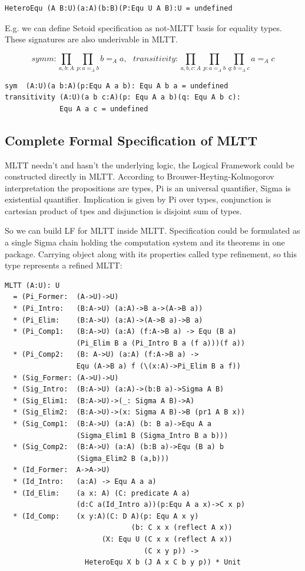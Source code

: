 \documentclass{svproc}
\begin{document}
\begin{lstlisting}[mathescape=true]
HeteroEqu (A B:U)(a:A)(b:B)(P:Equ U A B):U = undefined
\end{lstlisting}

E.g. we can define Setoid specification \cite{Bishop67} as not-MLTT basis
for equality types. These signatures are also underivable in MLTT.

$$symm : \prod_{a,b:A} \prod_{p:a =_A b} b =_A a,\ \ \ 
  transitivity : \prod_{a,b,c: A} \prod_{p: a =_A b} \prod_{q: b =_A c} a =_A c$$

\begin{lstlisting}[mathescape=true]
sym  (A:U)(a b:A)(p:Equ A a b): Equ A b a = undefined
transitivity (A:U)(a b c:A)(p: Equ A a b)(q: Equ A b c):
             Equ A a c = undefined
\end{lstlisting}

\subsection{Complete Formal Specification of MLTT}

MLTT needn't and hasn't the underlying logic, the Logical Framework could be constructed directly in MLTT.
According to Brouwer-Heyting-Kolmogorov interpretation the propositions are types,
Pi is an universal quantifier, Sigma is existential quantifier.
Implication is given by Pi over types, conjunction is cartesian
product of tpes and disjunction is disjoint sum of types.

So we can build LF for MLTT inside MLTT. Specification could be formulated as a
single Sigma chain holding the computation system and its theorems in one package.
Carrying object along with its properties called type refinement, so this type
represents a refined MLTT:

\begin{lstlisting}[mathescape=true]
MLTT (A:U): U
  = (Pi_Former:  (A->U)->U)
  * (Pi_Intro:   (B:A->U) (a:A)->B a->(A->B a))
  * (Pi_Elim:    (B:A->U) (a:A)->(A->B a)->B a)
  * (Pi_Comp1:   (B:A->U) (a:A) (f:A->B a) -> Equ (B a)
                 (Pi_Elim B a (Pi_Intro B a (f a)))(f a))
  * (Pi_Comp2:   (B: A->U) (a:A) (f:A->B a) ->
                 Equ (A->B a) f (\(x:A)->Pi_Elim B a f))
  * (Sig_Former: (A->U)->U)
  * (Sig_Intro:  (B:A->U) (a:A)->(b:B a)->Sigma A B)
  * (Sig_Elim1:  (B:A->U)->(_: Sigma A B)->A)
  * (Sig_Elim2:  (B:A->U)->(x: Sigma A B)->B (pr1 A B x))
  * (Sig_Comp1:  (B:A->U) (a:A) (b: B a)->Equ A a
                 (Sigma_Elim1 B (Sigma_Intro B a b)))
  * (Sig_Comp2:  (B:A->U) (a:A) (b:B a)->Equ (B a) b
                 (Sigma_Elim2 B (a,b)))
  * (Id_Former:  A->A->U)
  * (Id_Intro:   (a:A) -> Equ A a a)
  * (Id_Elim:    (a x: A) (C: predicate A a)
                 (d:C a(Id_Intro a))(p:Equ A a x)->C x p)
  * (Id_Comp:    (x y:A)(C: D A)(p: Equ A x y)
                              (b: C x x (reflect A x))
                       (X: Equ U (C x x (reflect A x))
                                 (C x y p)) ->
                   HeteroEqu X b (J A x C b y p)) * Unit
\end{lstlisting}
\end{document}
